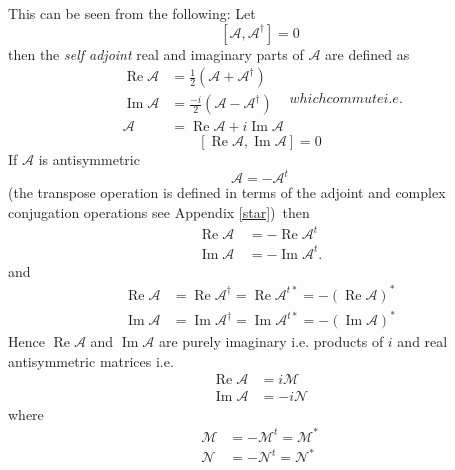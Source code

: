 \documentclass[aps,preprint]{revtex4}%
\begin{document}
This can be seen from the following: Let
\begin{equation}
\left[  \mathcal{A},\mathcal{A}^{\dagger}\right]  =0
\end{equation}
then the \emph{self adjoint }real and imaginary parts of $\mathcal{A}$ are
defined as
\begin{subequations}
\begin{align}
\operatorname{Re}\mathcal{A}  & =\frac{1}{2}\left(  \mathcal{A}+\mathcal{A}%
^{\dagger}\right) \\
\operatorname{Im}\mathcal{A}  & =\frac{-i}{2}\left(  \mathcal{A}%
-\mathcal{A}^{\dagger}\right) \\
\mathcal{A}  & =\operatorname{Re}\mathcal{A}+i\operatorname{Im}\mathcal{A}%
\end{align}
which commute i.e.
\end{subequations}
\begin{equation}
\left[  \operatorname{Re}\mathcal{A},\operatorname{Im}\mathcal{A}\right]  =0
\end{equation}
If $\mathcal{A}$ is antisymmetric
\begin{equation}
\mathcal{A}=-\mathcal{A}^{t}\label{at}%
\end{equation}
(the transpose operation is defined in terms of the adjoint and complex
conjugation operations see Appendix \ref{star})\ then
\begin{align}
\operatorname{Re}\mathcal{A\,}  & =-\operatorname{Re}\mathcal{A}%
^{t}\nonumber\\
\operatorname{Im}\mathcal{A\,}  & =-\operatorname{Im}\mathcal{A}^{t}.
\end{align}
and
\begin{align}
\operatorname{Re}\mathcal{A}  & =\operatorname{Re}\mathcal{A}^{\dagger
}=\operatorname{Re}\mathcal{A}^{t\ast}=-\left(  \operatorname{Re}%
\mathcal{A}\right)  ^{\ast}\nonumber\\
\operatorname{Im}\mathcal{A}  & =\operatorname{Im}\mathcal{A}^{\dagger
}=\operatorname{Im}\mathcal{A}^{t\ast}=-\left(  \operatorname{Im}%
\mathcal{A}\right)  ^{\ast}%
\end{align}
Hence $\operatorname{Re}\mathcal{A}$ and $\operatorname{Im}\mathcal{A}$ are
purely imaginary i.e. products of $i$ and real antisymmetric matrices i.e.
\begin{align}
\operatorname{Re}\mathcal{A}  & =i\mathcal{M}\nonumber\\
\operatorname{Im}\mathcal{A}  & =-i\mathcal{N}%
\end{align}
where
\begin{align}
\mathcal{M}  & =-\mathcal{M}^{t}=\mathcal{M}^{\ast}\nonumber\\
\mathcal{N}  & =-\mathcal{N}^{t}=\mathcal{N}^{\ast}%
\end{align}
\end{document}
